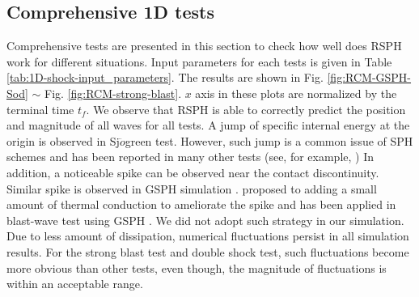 \subsection{Comprehensive 1D tests} \label{sec:comprehensive-1d-tests}
Comprehensive tests are presented in this section to check how well does RSPH work for different situations. Input parameters for each tests is given in Table \ref{tab:1D-shock-input_parameters}.
The results are shown in Fig. \ref{fig:RCM-GSPH-Sod} $\sim$ Fig. \ref{fig:RCM-strong-blast}. $x$ axis in these plots are normalized by the terminal time $t_f$. We observe that RSPH is able to correctly predict the position and magnitude of all waves for all tests. A jump of specific internal energy at the origin is observed in Sj$\ddot{o}$green test. However, such jump is a common issue of SPH schemes and has been reported in many other tests (see, for example, \citep{monaghan1997sph,cha2003implementations,puri2014approximate})
In addition, a noticeable spike can be observed near the contact discontinuity. Similar spike is observed in GSPH simulation \citep{puri2014comparison}. %
\citet{noh1987errors} proposed to adding a small amount of thermal conduction to ameliorate the spike and has been applied in blast-wave test using GSPH \citep{puri2014comparison}. We did not adopt such strategy in our simulation.
Due to less amount of dissipation, numerical fluctuations persist in all simulation results. For the strong blast test and double shock test, such fluctuations become more obvious than other tests, even though, the magnitude of fluctuations is within an acceptable range.

